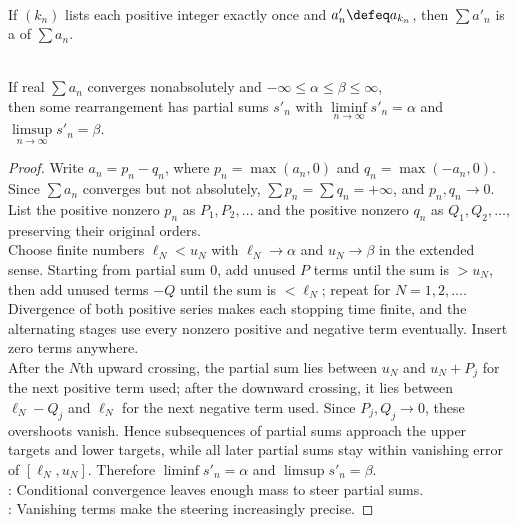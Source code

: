 \begin{definition} \label{def:series-rearrangement} \\
If $(k_n)$ lists each positive integer exactly once and $a'_n\defeq a_{k_n}$, then $\sum a'_n$ is a  of $\sum a_n$.
\end{definition}

\begin{theorem} \label{thm:riemann-rearrangement-theorem} \\
If real $\sum a_n$ converges nonabsolutely and $-\infty\leq\alpha\leq\beta\leq\infty$,\\
then some rearrangement has partial sums $s'_n$ with $\liminf\limits_{n\to\infty}s'_n=\alpha$ and $\limsup\limits_{n\to\infty}s'_n=\beta$.
\begin{proof}
Write $a_n=p_n-q_n$, where $p_n=\max(a_n,0)$ and $q_n=\max(-a_n,0)$. Since $\sum a_n$ converges but not absolutely, $\sum p_n=\sum q_n=+\infty$, and $p_n,q_n\to0$. List the positive nonzero $p_n$ as $P_1,P_2,\ldots$ and the positive nonzero $q_n$ as $Q_1,Q_2,\ldots$, preserving their original orders.\\
Choose finite numbers $\ell_N<u_N$ with $\ell_N\to\alpha$ and $u_N\to\beta$ in the extended sense. Starting from partial sum $0$, add unused $P$ terms until the sum is $>u_N$, then add unused terms $-Q$ until the sum is $<\ell_N$; repeat for $N=1,2,\ldots$. Divergence of both positive series makes each stopping time finite, and the alternating stages use every nonzero positive and negative term eventually. Insert zero terms anywhere.\\
After the $N$th upward crossing, the partial sum lies between $u_N$ and $u_N+P_j$ for the next positive term used; after the downward crossing, it lies between $\ell_N-Q_j$ and $\ell_N$ for the next negative term used. Since $P_j,Q_j\to0$, these overshoots vanish. Hence subsequences of partial sums approach the upper targets and lower targets, while all later partial sums stay within vanishing error of $[\ell_N,u_N]$. Therefore $\liminf s'_n=\alpha$ and $\limsup s'_n=\beta$.\\
: Conditional convergence leaves enough mass to steer partial sums.\\
: Vanishing terms make the steering increasingly precise.
\end{proof}
\end{theorem}

